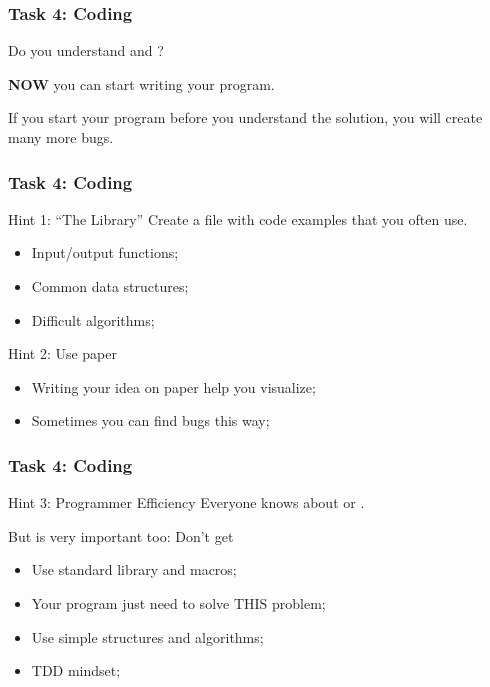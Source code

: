 \begin{frame}
  \frametitle{Task 4: Coding}

  Do you understand  and ?

  \bigskip

  {\bf NOW} you can start writing your program.

  \vfill

  \begin{block}{}
    If you start your program before you understand the solution, you
    will create many more bugs.
  \end{block}
\end{frame}

\begin{frame}
  \frametitle{Task 4: Coding}
  \begin{exampleblock}{Hint 1: ``The Library''}
    Create a file with code examples that you often use.
    \begin{itemize}
    \item Input/output functions;
    \item Common data structures;
    \item Difficult algorithms;
    \end{itemize}
   \end{exampleblock}

   \begin{block}{Hint 2: Use paper}
    \begin{itemize}
    \item Writing your idea on paper help you visualize;
    \item Sometimes you can find bugs this way;
    \end{itemize}
  \end{block}
\end{frame}

\begin{frame}
  \frametitle{Task 4: Coding}

  \begin{block}{Hint 3: Programmer Efficiency}
    Everyone knows about  or
    .

    \bigskip

    But  is very important too: Don't
    get 
  \end{block}

  \vfill

  \begin{itemize}
  \item Use standard library and macros;
  \item Your program just need to solve THIS problem;
  \item Use simple structures and algorithms;
  \item TDD mindset;
  \end{itemize}
\end{frame}


